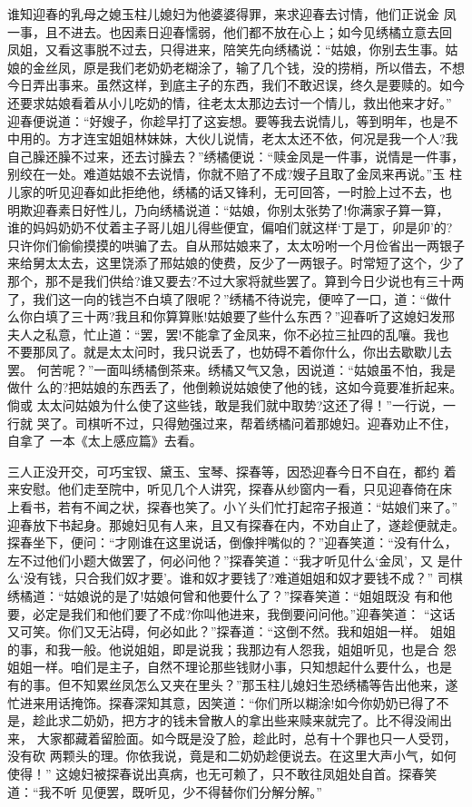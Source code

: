 谁知迎春的乳母之媳玉柱儿媳妇为他婆婆得罪，来求迎春去讨情，他们正说金
凤一事，且不进去。也因素日迎春懦弱，他们都不放在心上；如今见绣橘立意去回
凤姐，又看这事脱不过去，只得进来，陪笑先向绣橘说：“姑娘，你别去生事。姑
娘的金丝凤，原是我们老奶奶老糊涂了，输了几个钱，没的捞梢，所以借去，不想
今日弄出事来。虽然这样，到底主子的东西，我们不敢迟误，终久是要赎的。如今
还要求姑娘看着从小儿吃奶的情，往老太太那边去讨一个情儿，救出他来才好。”
迎春便说道：“好嫂子，你趁早打了这妄想。要等我去说情儿，等到明年，也是不
中用的。方才连宝姐姐林妹妹，大伙儿说情，老太太还不依，何况是我一个人?我
自己臊还臊不过来，还去讨臊去？”绣橘便说：“赎金凤是一件事，说情是一件事，
别绞在一处。难道姑娘不去说情，你就不赔了不成?嫂子且取了金凤来再说。”玉
柱儿家的听见迎春如此拒绝他，绣橘的话又锋利，无可回答，一时脸上过不去，也
明欺迎春素日好性儿，乃向绣橘说道：“姑娘，你别太张势了!你满家子算一算，
谁的妈妈奶奶不仗着主子哥儿姐儿得些便宜，偏咱们就这样‘丁是丁，卯是卯’的?
只许你们偷偷摸摸的哄骗了去。自从邢姑娘来了，太太吩咐一个月俭省出一两银子
来给舅太太去，这里饶添了邢姑娘的使费，反少了一两银子。时常短了这个，少了
那个，那不是我们供给?谁又要去?不过大家将就些罢了。算到今日少说也有三十两
了，我们这一向的钱岂不白填了限呢？”绣橘不待说完，便啐了一口，道：“做什
么你白填了三十两?我且和你算算账!姑娘要了些什么东西？”迎春听了这媳妇发邢
夫人之私意，忙止道：“罢，罢!不能拿了金凤来，你不必拉三扯四的乱嚷。我也
不要那凤了。就是太太问时，我只说丢了，也妨碍不着你什么，你出去歇歇儿去罢。
何苦呢？”一面叫绣橘倒茶来。绣橘又气又急，因说道：“姑娘虽不怕，我是做什
么的?把姑娘的东西丢了，他倒赖说姑娘使了他的钱，这如今竟要准折起来。倘或
太太问姑娘为什么使了这些钱，敢是我们就中取势?这还了得！”一行说，一行就
哭了。司棋听不过，只得勉强过来，帮着绣橘问着那媳妇。迎春劝止不住，自拿了
一本《太上感应篇》去看。

三人正没开交，可巧宝钗、黛玉、宝琴、探春等，因恐迎春今日不自在，都约
着来安慰。他们走至院中，听见几个人讲究，探春从纱窗内一看，只见迎春倚在床
上看书，若有不闻之状，探春也笑了。小丫头们忙打起帘子报道：“姑娘们来了。”
迎春放下书起身。那媳妇见有人来，且又有探春在内，不劝自止了，遂趁便就走。
探春坐下，便问：“才刚谁在这里说话，倒像拌嘴似的？”迎春笑道：“没有什么，
左不过他们小题大做罢了，何必问他？”探春笑道：“我才听见什么‘金凤’，又
是什么‘没有钱，只合我们奴才要’。谁和奴才要钱了?难道姐姐和奴才要钱不成？”
司棋绣橘道：“姑娘说的是了!姑娘何曾和他要什么了？”探春笑道：“姐姐既没
有和他要，必定是我们和他们要了不成?你叫他进来，我倒要问问他。”迎春笑道：
“这话又可笑。你们又无沾碍，何必如此？”探春道：“这倒不然。我和姐姐一样。
姐姐的事，和我一般。他说姐姐，即是说我；我那边有人怨我，姐姐听见，也是合
怨姐姐一样。咱们是主子，自然不理论那些钱财小事，只知想起什么要什么，也是
有的事。但不知累丝凤怎么又夹在里头？”那玉柱儿媳妇生恐绣橘等告出他来，遂
忙进来用话掩饰。探春深知其意，因笑道：“你们所以糊涂!如今你奶奶已得了不
是，趁此求二奶奶，把方才的钱未曾散人的拿出些来赎来就完了。比不得没闹出来，
大家都藏着留脸面。如今既是没了脸，趁此时，总有十个罪也只一人受罚，没有砍
两颗头的理。你依我说，竟是和二奶奶趁便说去。在这里大声小气，如何使得！”
这媳妇被探春说出真病，也无可赖了，只不敢往凤姐处自首。探春笑道：“我不听
见便罢，既听见，少不得替你们分解分解。”

